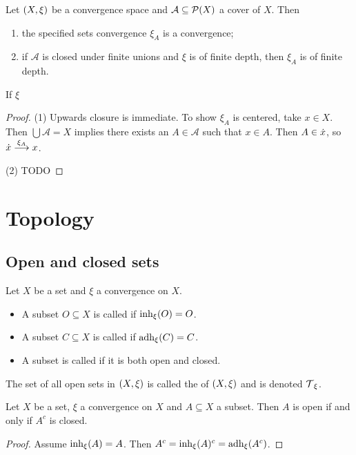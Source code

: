 \begin{lemma}
Let $\left( X,\xi \right)$ be a convergence space and $\mathcal{A}\subseteq \operatorname{\mathcal{P}}(X)$ a cover of $X$. Then
\begin{enumerate}
\item the specified sets convergence $\xi_A$ is a convergence;
\item if $\mathcal{A}$ is closed under finite unions and $\xi$ is of finite depth, then $\xi_A$ is of finite depth.
\end{enumerate}


If $\xi $
\end{lemma}
\begin{proof}
(1) Upwards closure is immediate. To show $\xi_A$ is centered, take $x\in X$. Then $\bigcup \mathcal{A} = X$ implies there exists an $A\in \mathcal{A}$ such that $x\in A$. Then $A\in \dot{x}$, so $\dot{x} \overset{\xi_A}{\longrightarrow} x$.

(2) TODO
\end{proof}



\section{Topology}
\subsection{Open and closed sets}
\begin{definition}
Let $X$ be a set and $\xi$ a convergence on $X$.
\begin{itemize}
    \item A subset $O \subseteq X$ is called  if $\operatorname{inh}_\xi(O) = O$.
    \item A subset $C \subseteq X$ is called  if $\operatorname{adh}_\xi(C) = C$.
    \item A subset is called  if it is both open and closed.
\end{itemize}
The set of all open sets in $\left( X,\xi \right)$ is called the  of $\left( X,\xi \right)$ and is denoted $\operatorname{\mathcal{T}}_\xi$.
\end{definition}

\begin{lemma} \label{openClosedComplement}
Let $X$ be a set, $\xi$ a convergence on $X$ and $A\subseteq X$ a subset. Then $A$ is open \textup{if and only if} $A^c$ is closed.
\end{lemma}
\begin{proof}
Assume $\operatorname{inh}_\xi(A) = A$. Then $A^c = \operatorname{inh}_\xi(A)^c = \operatorname{adh}_\xi(A^c)$.
\end{proof}

